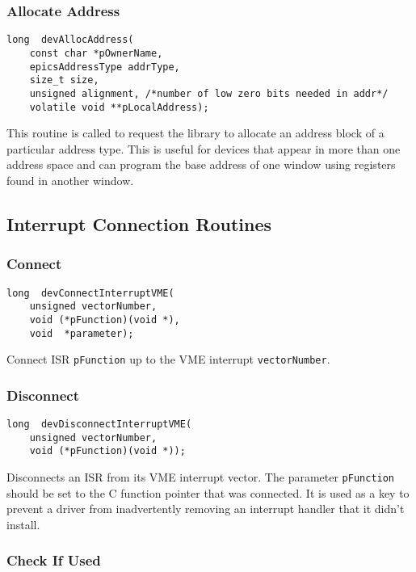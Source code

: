 \subsubsection{Allocate Address}

\begin{verbatim}
long  devAllocAddress(
    const char *pOwnerName,
    epicsAddressType addrType,
    size_t size,
    unsigned alignment, /*number of low zero bits needed in addr*/
    volatile void **pLocalAddress);
\end{verbatim}

This routine is called to request the library to allocate an address block of a particular address type. This is useful for 
devices that appear in more than one address space and can program the base address of one window using registers found 
in another window.

\subsection{Interrupt Connection Routines}

\subsubsection{Connect}

\begin{verbatim}
long  devConnectInterruptVME(
    unsigned vectorNumber,
    void (*pFunction)(void *),
    void  *parameter);
\end{verbatim}

Connect ISR \verb|pFunction| up to the VME interrupt \verb|vectorNumber|.

\subsubsection{Disconnect}

\begin{verbatim}
long  devDisconnectInterruptVME(
    unsigned vectorNumber,
    void (*pFunction)(void *));
\end{verbatim}

Disconnects an ISR from its VME interrupt vector. The parameter \verb|pFunction| should be set to the C function pointer 
that was connected. It is used as a key to prevent a driver from inadvertently removing an interrupt handler that it didn't 
install.

\subsubsection{Check If Used}

